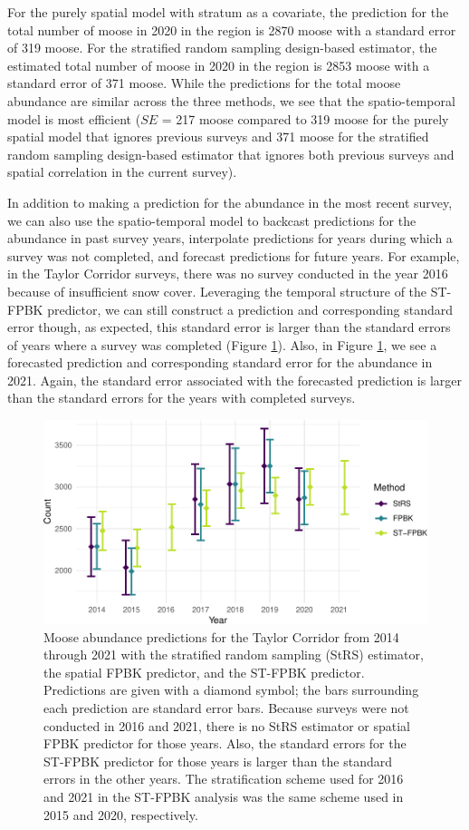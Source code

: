 \documentclass[]{article}    %
\begin{document}
For the purely spatial model with stratum as a covariate, the prediction
for the total number of moose in 2020 in the region is 2870 moose with a
standard error of 319 moose. For the stratified random sampling
design-based estimator, the estimated total number of moose in 2020 in
the region is 2853 moose with a standard error of 371 moose. While the
predictions for the total moose abundance are similar across the three
methods, we see that the spatio-temporal model is most efficient (\(SE\)
= 217 moose compared to 319 moose for the purely spatial model that
ignores previous surveys and 371 moose for the stratified random
sampling design-based estimator that ignores both previous surveys and
spatial correlation in the current survey).

In addition to making a prediction for the abundance in the most recent
survey, we can also use the spatio-temporal model to backcast
predictions for the abundance in past survey years, interpolate
predictions for years during which a survey was not completed, and
forecast predictions for future years. For example, in the Taylor
Corridor surveys, there was no survey conducted in the year 2016 because
of insufficient snow cover. Leveraging the temporal structure of the
ST-FPBK predictor, we can still construct a prediction and corresponding
standard error though, as expected, this standard error is larger than
the standard errors of years where a survey was completed (Figure
\ref{fig:trend}). Also, in Figure \ref{fig:trend}, we see a forecasted
prediction and corresponding standard error for the abundance in 2021.
Again, the standard error associated with the forecasted prediction is
larger than the standard errors for the years with completed surveys.

\begin{figure}
\centering
\includegraphics{temporal_analysis.pdf}
\caption{\label{fig:trend} Moose abundance predictions for the Taylor
Corridor from 2014 through 2021 with the stratified random sampling
(StRS) estimator, the spatial FPBK predictor, and the ST-FPBK predictor.
Predictions are given with a diamond symbol; the bars surrounding each
prediction are standard error bars. Because surveys were not conducted
in 2016 and 2021, there is no StRS estimator or spatial FPBK predictor
for those years. Also, the standard errors for the ST-FPBK predictor for
those years is larger than the standard errors in the other years. The
stratification scheme used for 2016 and 2021 in the ST-FPBK analysis was
the same scheme used in 2015 and 2020, respectively.}
\end{figure}
\end{document}
